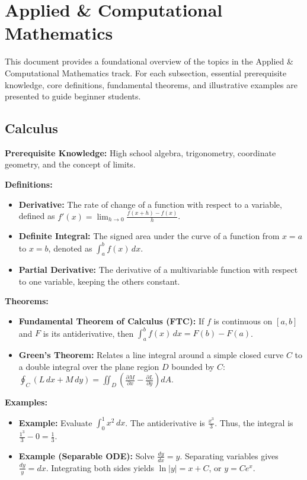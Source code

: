 \chapter{Applied \& Computational Mathematics}

This document provides a foundational overview of the topics in the Applied \& Computational Mathematics track. For each subsection, essential prerequisite knowledge, core definitions, fundamental theorems, and illustrative examples are presented to guide beginner students.

\section{Calculus}
\textbf{Prerequisite Knowledge:} High school algebra, trigonometry, coordinate geometry, and the concept of limits.

\textbf{Definitions:}
\begin{itemize}
    \item \textbf{Derivative:} The rate of change of a function with respect to a variable, defined as $f'(x) = \lim_{h \to 0} \frac{f(x+h) - f(x)}{h}$.
    \item \textbf{Definite Integral:} The signed area under the curve of a function from $x=a$ to $x=b$, denoted as $\int_a^b f(x) \,dx$.
    \item \textbf{Partial Derivative:} The derivative of a multivariable function with respect to one variable, keeping the others constant.
\end{itemize}

\textbf{Theorems:}
\begin{itemize}
    \item \textbf{Fundamental Theorem of Calculus (FTC):} If $f$ is continuous on $[a,b]$ and $F$ is its antiderivative, then $\int_a^b f(x) \,dx = F(b) - F(a)$.
    \item \textbf{Green's Theorem:} Relates a line integral around a simple closed curve $C$ to a double integral over the plane region $D$ bounded by $C$: $\oint_C (L\,dx + M\,dy) = \iint_D \left(\frac{\partial M}{\partial x} - \frac{\partial L}{\partial y}\right) dA$.
\end{itemize}

\textbf{Examples:}
\begin{itemize}
    \item \textbf{Example:} Evaluate $\int_0^1 x^2 \,dx$. The antiderivative is $\frac{x^3}{3}$. Thus, the integral is $\frac{1^3}{3} - 0 = \frac{1}{3}$.
    \item \textbf{Example (Separable ODE):} Solve $\frac{dy}{dx} = y$. Separating variables gives $\frac{dy}{y} = dx$. Integrating both sides yields $\ln|y| = x + C$, or $y = Ce^x$.
\end{itemize}


